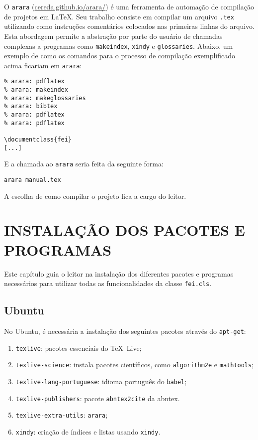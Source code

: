 \documentclass{fei}
\begin{document}
	O \texttt{arara} (\href{cereda.github.io/arara/}{cereda.github.io/arara/}) é uma ferramenta de automação de compilação de projetos em \LaTeX. Seu trabalho consiste em compilar um arquivo \texttt{.tex} utilizando como instruções comentários colocados nas primeiras linhas do arquivo. Esta abordagem permite a abstração por parte do usuário de chamadas complexas a programas como \texttt{makeindex}, \texttt{xindy} e \texttt{glossaries}. Abaixo, um exemplo de como os comandos para o processo de compilação exemplificado acima ficariam em \texttt{arara}:
	
	\begin{verbatim}
% arara: pdflatex
% arara: makeindex
% arara: makeglossaries
% arara: bibtex
% arara: pdflatex
% arara: pdflatex

\documentclass{fei}
[...]
	\end{verbatim}
	
	E a chamada ao \texttt{arara} seria feita da seguinte forma:
	
	\texttt{arara manual.tex}
	
	A escolha de como compilar o projeto fica a cargo do leitor.	
	
	\chapter{INSTALAÇÃO DOS PACOTES E PROGRAMAS}	\label{chap:instalacao}
	
	Este capítulo guia o leitor na instalação dos diferentes pacotes e programas necessários para utilizar todas as funcionalidades da classe \texttt{fei.cls}.
	
	\section{Ubuntu}
	
	No Ubuntu, é necessária a instalação dos seguintes pacotes através do \texttt{apt-get}:
	
	\begin{enumerate}
	\item \texttt{texlive}: pacotes essenciais do \TeX~Live;
	\item \texttt{texlive-science}: instala pacotes científicos, como \texttt{algorithm2e} e \texttt{mathtools};
	\item \texttt{texlive-lang-portuguese}: idioma português do \texttt{babel};
	\item \texttt{texlive-publishers}: pacote \texttt{abntex2cite} da \gls{abntex}.
	\item \texttt{texlive-extra-utils}: \texttt{arara};
	\item \texttt{xindy}: criação de índices e listas usando \texttt{xindy}.
	\end{enumerate}
	

	\indice
	
\end{document}
